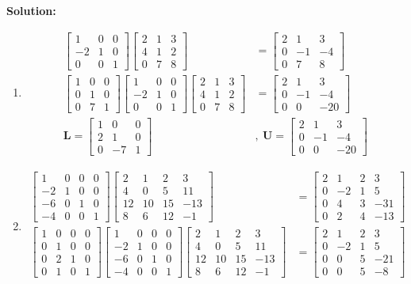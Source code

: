 \documentclass[]{article}
\newcommand{\ML}{\bm{L}}				%
\newcommand{\MU}{\bm{U}}				%
\newcommand{\bbm}{\begin{bmatrix}}		%
\newcommand{\ebm}{\end{bmatrix}}		%
\newcommand{\solution}{\vskip 0.5cm \textbf{\large Solution:} \\}
\begin{document}
\begin{enumerate}
	  \solution
	  \begin{enumerate}
	  \item
        \[\begin{split}
        \bbm 1&0&0 \\ -2&1&0 \\ 0&0&1 \ebm \bbm 2&1&3\\4&1&2\\0&7&8 \ebm &= \bbm 2&1&3\\0&-1&-4\\0&7&8 \ebm \\
        \bbm 1&0&0 \\ 0&1&0 \\ 0&7&1 \ebm \bbm 1&0&0 \\ -2&1&0 \\ 0&0&1 \ebm \bbm 2&1&3\\4&1&2\\0&7&8 \ebm &= \bbm 2&1&3\\0&-1&-4\\0&0&-20 \ebm \\
        \ML = \bbm 1&0&0 \\ 2&1&0 \\ 0&-7&1 \ebm&,~\MU = \bbm 2&1&3\\0&-1&-4\\0&0&-20 \ebm
        \end{split}\]
	  \item
        \[\begin{split}
        \bbm 1&0&0&0 \\ -2&1&0&0 \\ -6&0&1&0 \\ -4&0&0&1 \ebm \bbm 2&1&2&3\\4&0&5&11\\12&10&15&-13\\8&6&12&-1 \ebm &= \bbm 2&1&2&3\\0&-2&1&5\\0&4&3&-31\\0&2&4&-13 \ebm \\
        \bbm 1&0&0&0 \\ 0&1&0&0 \\ 0&2&1&0 \\ 0&1&0&1 \ebm \bbm 1&0&0&0 \\ -2&1&0&0 \\ -6&0&1&0 \\ -4&0&0&1 \ebm \bbm 2&1&2&3\\4&0&5&11\\12&10&15&-13\\8&6&12&-1 \ebm &= \bbm 2&1&2&3\\0&-2&1&5\\0&0&5&-21\\0&0&5&-8 \ebm \\

\end{split}\]
\end{enumerate}
\end{enumerate}
\end{document}
